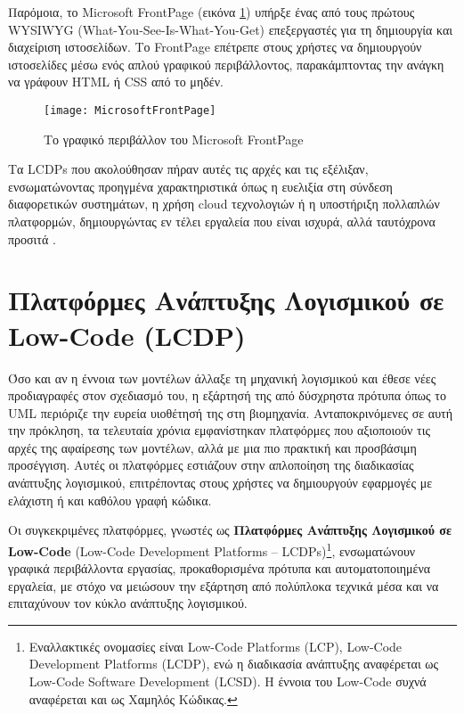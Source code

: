             Παρόμοια, το Microsoft FrontPage (εικόνα \ref{fig:MicrosoftFrontPage}) υπήρξε ένας από τους πρώτους WYSIWYG (What-You-See-Is-What-You-Get) επεξεργαστές για τη δημιουργία και διαχείριση ιστοσελίδων. Το FrontPage επέτρεπε στους χρήστες να δημιουργούν ιστοσελίδες μέσω ενός απλού γραφικού περιβάλλοντος, παρακάμπτοντας την ανάγκη να γράφουν HTML ή CSS από το μηδέν.

            \begin{figure}[h!] \noindent \centering
                \texttt{[image: MicrosoftFrontPage]}
                \caption{\centering Το γραφικό περιβάλλον του Microsoft FrontPage \cite{LowCodeSimon}}
                \label{fig:MicrosoftFrontPage}
            \end{figure}

            Τα LCDPs που ακολούθησαν πήραν αυτές τις αρχές και τις εξέλιξαν, ενσωματώνοντας προηγμένα χαρακτηριστικά όπως η ευελιξία στη σύνδεση διαφορετικών συστημάτων, η χρήση cloud τεχνολογιών ή η υποστήριξη πολλαπλών πλατφορμών, δημιουργώντας εν τέλει εργαλεία που είναι ισχυρά, αλλά ταυτόχρονα προσιτά \cite{LowCodeSimon}.


    \section{Πλατφόρμες Ανάπτυξης Λογισμικού σε Low-Code (LCDP)} \label{sec:LCDP}
        Όσο και αν η έννοια των μοντέλων άλλαξε τη μηχανική λογισμικού και έθεσε νέες προδιαγραφές στον σχεδιασμό του, η εξάρτησή της από δύσχρηστα πρότυπα όπως το UML περιόριζε την ευρεία υιοθέτησή της στη βιομηχανία. Ανταποκρινόμενες σε αυτή την πρόκληση, τα τελευταία χρόνια εμφανίστηκαν πλατφόρμες που αξιοποιούν τις αρχές της αφαίρεσης των μοντέλων, αλλά με μια πιο πρακτική και προσβάσιμη προσέγγιση. Αυτές οι πλατφόρμες εστιάζουν στην απλοποίηση της διαδικασίας ανάπτυξης λογισμικού, επιτρέποντας στους χρήστες να δημιουργούν εφαρμογές με ελάχιστη ή και καθόλου γραφή κώδικα.

        Οι συγκεκριμένες πλατφόρμες, γνωστές ως \textbf{Πλατφόρμες Ανάπτυξης Λογισμικού σε Low-Code} (Low-Code Development Platforms -- LCDPs)\footnote{Εναλλακτικές ονομασίες είναι Low-Code Platforms (LCP), Low-Code Development Platforms (LCDP), ενώ η διαδικασία ανάπτυξης αναφέρεται ως Low-Code Software Development (LCSD). Η έννοια του Low-Code συχνά αναφέρεται και ως Χαμηλός Κώδικας.}, ενσωματώνουν γραφικά περιβάλλοντα εργασίας, προκαθορισμένα πρότυπα και αυτοματοποιημένα εργαλεία, με στόχο να μειώσουν την εξάρτηση από πολύπλοκα τεχνικά μέσα και να επιταχύνουν τον κύκλο ανάπτυξης λογισμικού. \cite{Bock2021}

